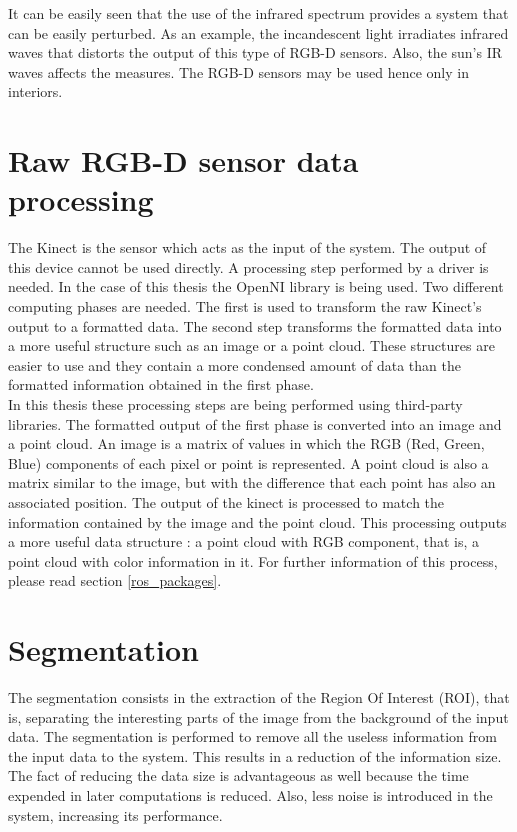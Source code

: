 It can be easily seen that the use of the infrared spectrum provides a system that can be easily perturbed. 
As an example, the incandescent light irradiates infrared waves that distorts the output of this type of RGB-D sensors. 
Also, the sun's IR waves affects the measures. 
The RGB-D sensors may be used hence only in interiors. 




\section{Raw RGB-D sensor data processing}
\label{input_data}
The Kinect is the sensor which acts as the input of the system. 
The output of this device cannot be used directly. 
A processing step performed by a driver is needed. 
In the case of this thesis the OpenNI library is being used. 
Two different computing phases are needed. 
The first is used to transform the raw Kinect's output to a formatted data. 
The second step transforms the formatted data into a more useful structure such as an image or a point cloud. 
These structures are easier to use and they contain a more condensed amount of data than the formatted information obtained in the first phase. 
\\

In this thesis these processing steps are being performed using third-party libraries. 
The formatted output of the first phase is converted into an image and a point cloud. 
An image is a matrix of values in which the RGB (Red, Green, Blue) components of each pixel or point is represented. 
A point cloud is also a matrix similar to the image, but with the difference that each point has also an associated position. 
The output of the kinect is processed to match the information contained by the image and the point cloud. 
This processing outputs a more useful data structure : a point cloud with RGB component, that is, a point cloud with color information in it. 
For further information of this process, please read section \ref{ros_packages}.


\section{Segmentation}
\label{segmentation}
The segmentation consists in the extraction of the Region Of Interest (ROI), that is, separating the interesting parts of the image from the background of the input data. 
The segmentation is performed to remove all the useless information from the input data to the system. 
This results in a reduction of the information size. 
The fact of reducing the data size is advantageous as well because the time expended in later computations is reduced. 
Also, less noise is introduced in the system, increasing its performance. 
\\

